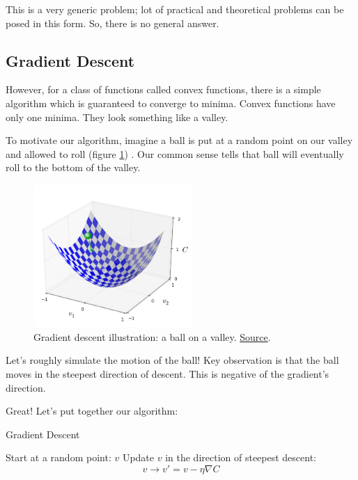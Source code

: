 \documentclass[a4paper]{tufte-handout}
\begin{document}
This is a very generic problem; lot of practical and theoretical
problems can be posed in this form. So, there is no general answer.

\subsection{Gradient Descent}\label{gradient-descent}

However, for a class of functions called convex functions, there is a
simple algorithm which is guaranteed to converge to minima. Convex
functions have only one minima. They look something like a valley.

To motivate our algorithm, imagine a ball
is put at a random point on our valley and allowed to roll (figure \ref{fig:valley}) . Our common
sense tells that ball will eventually roll to the bottom of the valley.

\begin{figure}[htb!]
  \includegraphics[width=60mm]{valley_with_ball}
  \caption{Gradient descent illustration: a ball on a valley.
\href{http://neuralnetworksanddeeplearning.com/chap1.html}{Source}.}
\label{fig:valley}
\end{figure}


Let's roughly simulate the motion of the ball! Key observation is that
the ball moves in the steepest direction of descent. This is negative
of the gradient's direction.

Great! Let's put together our algorithm:


\begin{algorithm}
\caption{Gradient Descent}
\begin{algorithmic}[1]
  \STATE Start at a random point: \(v\)
  \STATE Update \(v\) in the direction of steepest descent: 
      \[v \rightarrow v' = v -\eta \nabla C\]
  \ENDWHILE
\end{algorithmic}
\end{algorithm}
\end{document}
